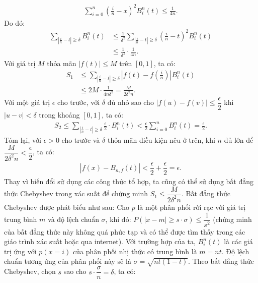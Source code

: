 \begin{multicols}{2}
\begin{align*}
			\sum\limits_{i = 0}^n {{{\left( {\frac{i}{n} - x} \right)}^2}B_i^n(t) \le \frac{1}{{4n}}.}
		\end{align*}
		Do đó:
		\begin{align*}
			\sum\limits_{\left| {\frac{i}{n} - t} \right| \ge \delta } {B_i^n(t)} &\le  \frac{1}{{{\delta ^2}}}\sum\limits_{\left| {\frac{i}{n} - t} \right| \ge \delta } {{\left( {\frac{i}{n} - t} \right)}^2}B_i^n(t) \\
			&\le \frac{1}{{{\delta ^2}}} \cdot \frac{1}{{4n}}.
		\end{align*}
		Với giá trị $M$ thỏa mãn $|f(t)| \le M$ trên $[0,1]$, ta có:
		\begin{align*}
			{S_1} &\le \sum\limits_{\left| {\frac{i}{n} - t} \right| \ge \delta } \left| {f(t) - f\left( {\frac{i}{n}} \right)} \right|B_i^n(t) \\
			&\le 2M \cdot \frac{1}{{4n{\delta ^2}}} = \frac{M}{{2{\delta ^2}n}}.
		\end{align*}
		Với một giá trị $\epsilon$ cho trước, với $\delta$ đủ nhỏ sao cho $|f(u)-f(v)| \le \dfrac{\epsilon}{2}$ khi $|u-v|< \delta$ trong khoảng $[0,1]$, ta có:
		\begin{align*}
			{S_2} \le \sum\limits_{\left| {\frac{i}{n} - t} \right| \ge \delta } {\frac{\epsilon}{2} \cdot B_i^n(t)}  < \frac{\epsilon}{2}\sum\limits_{i = 0}^n {B_i^n(t) = \frac{\epsilon}{2}}.
		\end{align*}
		Tóm lại, với $\epsilon>0$ cho trước và $\delta$ thỏa mãn điều kiện nêu ở trên, khi $n$ đủ lớn để $\dfrac{M}{2\delta^2n} < \dfrac{\epsilon}{2}$, ta có:
		\begin{align*}
			|f(x)- B_{n,f}(t)| < \dfrac{\epsilon}{2} + \dfrac{\epsilon}{2} = \epsilon.
		\end{align*}
		Thay vì biến đổi sử dụng các công thức tổ hợp, ta cũng có thể sử dụng bất đẳng thức Chebyshev trong xác suất để chứng minh $S_1 \le \dfrac{M}{2\delta^2n}$. Bất đẳng thức Chebyshev được phát biểu như sau: Cho $p$ là một phân phối rời rạc với giá trị trung bình $m$ và độ lệch chuẩn $\sigma$, khi đó: $P(|x-m| \ge s \cdot \sigma) \le \dfrac{1}{s^2}$ (chứng minh của bất đẳng thức này không quá phức tạp và có thể được tìm thấy trong các giáo trình xác suất hoặc qua internet). Với trường hợp của ta, $B_i^n (t)$ là các giá trị ứng với $p(x=i)$ của phân phối nhị thức có trung bình là $m=nt$. Độ lệch chuẩn tương ứng của phân phối này sẽ là $\sigma = \sqrt{nt(1-t)}$. Theo bất đẳng thức Chebyshev, chọn $s$ sao cho $s \cdot \dfrac{\sigma}{n} = \delta$, ta có:
		\begin{align*}

\end{align*}
\end{multicols}
